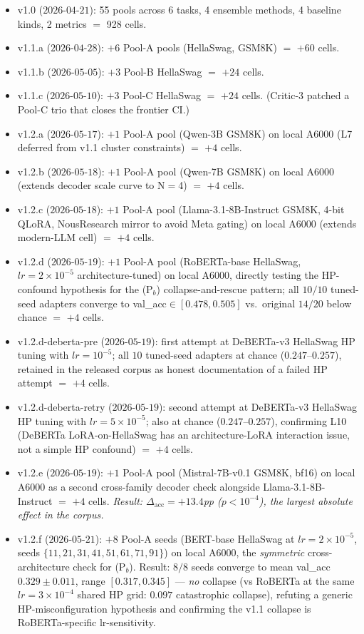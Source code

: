 \documentclass[11pt]{article}
\begin{document}
\begin{itemize}[leftmargin=*]
\item v1.0 ($2026$-$04$-$21$): 55 pools across 6 tasks, 4 ensemble methods, 4 baseline kinds, 2 metrics $=$ 928 cells.
\item v1.1.a ($2026$-$04$-$28$): $+6$ Pool-A pools (HellaSwag, GSM8K) $=$ $+60$ cells.
\item v1.1.b ($2026$-$05$-$05$): $+3$ Pool-B HellaSwag $=$ $+24$ cells.
\item v1.1.c ($2026$-$05$-$10$): $+3$ Pool-C HellaSwag $=$ $+24$ cells. (Critic-3 patched a Pool-C trio that closes the frontier CI.)
\item v1.2.a ($2026$-$05$-$17$): $+1$ Pool-A pool (Qwen-3B GSM8K) on local A6000 (L7 deferred from v1.1 cluster constraints) $=$ $+4$ cells.
\item v1.2.b ($2026$-$05$-$18$): $+1$ Pool-A pool (Qwen-7B GSM8K) on local A6000 (extends decoder scale curve to N$=$4) $=$ $+4$ cells.
\item v1.2.c ($2026$-$05$-$18$): $+1$ Pool-A pool (Llama-3.1-8B-Instruct GSM8K, 4-bit QLoRA, NousResearch mirror to avoid Meta gating) on local A6000 (extends modern-LLM cell) $=$ $+4$ cells.
\item v1.2.d ($2026$-$05$-$19$): $+1$ Pool-A pool (RoBERTa-base HellaSwag, $lr{=}2{\times}10^{-5}$ architecture-tuned) on local A6000, directly testing the HP-confound hypothesis for the (P$_b$) collapse-and-rescue pattern; all $10/10$ tuned-seed adapters converge to val\_acc${\in}[0.478, 0.505]$ vs.\ original $14/20$ below chance $=$ $+4$ cells.
\item v1.2.d-deberta-pre ($2026$-$05$-$19$): first attempt at DeBERTa-v3 HellaSwag HP tuning with $lr{=}10^{-5}$; all $10$ tuned-seed adapters at chance ($0.247$--$0.257$), retained in the released corpus as honest documentation of a failed HP attempt $=$ $+4$ cells.
\item v1.2.d-deberta-retry ($2026$-$05$-$19$): second attempt at DeBERTa-v3 HellaSwag HP tuning with $lr{=}5{\times}10^{-5}$; also at chance ($0.247$--$0.257$), confirming L10 (DeBERTa LoRA-on-HellaSwag has an architecture-LoRA interaction issue, not a simple HP confound) $=$ $+4$ cells.
\item v1.2.e ($2026$-$05$-$19$): $+1$ Pool-A pool (Mistral-7B-v0.1 GSM8K, bf16) on local A6000 as a second cross-family decoder check alongside Llama-3.1-8B-Instruct $=$ $+4$ cells. \emph{Result: $\Delta_{\text{acc}}{=}{+}13.4$pp ($p{<}10^{-4}$), the largest absolute effect in the corpus.}
\item v1.2.f ($2026$-$05$-$21$): $+8$ Pool-A seeds (BERT-base HellaSwag at $lr{=}2{\times}10^{-5}$, seeds $\{11, 21, 31, 41, 51, 61, 71, 91\}$) on local A6000, the \emph{symmetric} cross-architecture check for (P$_b$). Result: $8/8$ seeds converge to mean val\_acc $0.329 \pm 0.011$, range $[0.317, 0.345]$ — \emph{no} collapse (vs RoBERTa at the same $lr{=}3{\times}10^{-4}$ shared HP grid: $0.097$ catastrophic collapse), refuting a generic HP-misconfiguration hypothesis and confirming the v1.1 collapse is RoBERTa-specific lr-sensitivity.

\end{itemize}
\end{document}
